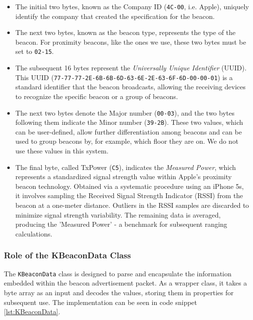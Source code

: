 \begin{itemize}
  \item The initial two bytes, known as the Company ID (\texttt{4C-00}, i.e. Apple), uniquely identify the company that created the specification for the beacon.
  \item The next two bytes, known as the beacon type, represents the type of the beacon. For proximity beacons, like the ones we use, these two bytes must be set to \texttt{02-15}.
  \item The subsequent 16 bytes represent the \textit{Universally Unique Identifier} (UUID).
This UUID (\texttt{77-77-77-2E-6B-6B-6D-63-6E-2E-63-6F-6D-00-00-01}) is a standard identifier that the beacon broadcasts, allowing the receiving devices to recognize the specific beacon or a group of beacons.
  \item The next two bytes denote the Major number (\texttt{00-03}), and the two bytes following them indicate the Minor number (\texttt{39-2B}). 
These two values, which can be user-defined, allow further differentiation among beacons and can be used to group beacons by, for example, which floor they are on. We do not use these values in this system.
  \item The final byte, called TxPower (\texttt{C5}), indicates the \textit{Measured Power}, which represents a standardized signal strength value within Apple's proximity beacon technology. Obtained via a systematic procedure using an iPhone 5s, it involves sampling the Received Signal Strength Indicator (RSSI) from the beacon at a one-meter distance. Outliers in the RSSI samples are discarded to minimize signal strength variability. The remaining data is averaged, producing the 'Measured Power' - a benchmark for subsequent ranging calculations.
\end{itemize}

\subsubsection{Role of the KBeaconData Class}

The \texttt{KBeaconData} class is designed to parse and encapsulate the information embedded within the beacon advertisement packet.
As a wrapper class, it takes a byte array as an input and decodes the values, storing them in properties for subsequent use.
The implementation can be seen in code snippet \ref{lst:KBeaconData}.



